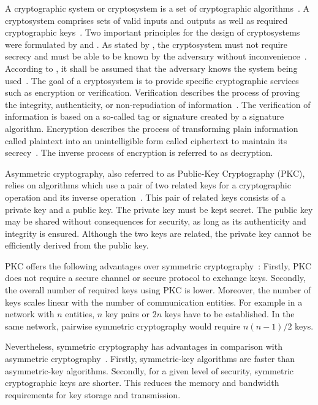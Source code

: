 A cryptographic system or cryptosystem is a set of cryptographic algorithms~\cite{Menezes1996}.
A cryptosystem comprises sets of valid inputs and outputs as well as required cryptographic keys~\cite{Eckert2023}.
Two important principles for the design of cryptosystems were formulated by \citeauthor{Kerckhoffs1883} and \citeauthor{Shannon1949}.
As stated by \citeauthor{Kerckhoffs1883}, the cryptosystem must not require secrecy and must be able to be known by the adversary without inconvenience~\cite{Kerckhoffs1883}.
According to \citeauthor{Shannon1949}, it shall be assumed that the adversary knows the system being used~\cite{Shannon1949}.
The goal of a cryptosystem is to provide specific cryptographic services such as encryption or verification.
Verification describes the process of proving the integrity, authenticity, or non-repudiation of information~\cite{Boneh2023}.
The verification of information is based on a so-called tag or signature created by a signature algorithm.
Encryption describes the process of transforming plain information called plaintext into an unintelligible form called ciphertext to maintain its secrecy~\cite{Barker2016,Boneh2023}.
The inverse process of encryption is referred to as decryption.

Asymmetric cryptography, also referred to as Public-Key Cryptography (PKC), relies on algorithms which use a pair of two related keys for a cryptographic operation and its inverse operation~\cite{Barker2020,CNSS2022,Eckert2023}.
This pair of related keys consists of a private key and a public key.
The private key must be kept secret.
The public key may be shared without consequences for security, as long as its authenticity and integrity is ensured.
Although the two keys are related, the private key cannot be efficiently derived from the public key.

PKC offers the following advantages over symmetric cryptography~\cite{Barker2020,Eckert2023}:
Firstly, PKC does not require a secure channel or secure protocol to exchange keys.
Secondly, the overall number of required keys using PKC is lower.
Moreover, the number of keys scales linear with the number of communication entities.
For example in a network with $n$ entities, $n$ key pairs or $2n$ keys have to be established.
In the same network, pairwise symmetric cryptography would require $n(n-1)/2$ keys.

Nevertheless, symmetric cryptography has advantages in comparison with asymmetric cryptography~\cite{Barker2020}.
Firstly, symmetric-key algorithms are faster than asymmetric-key algorithms.
Secondly, for a given level of security, symmetric cryptographic keys are shorter.
This reduces the memory and bandwidth requirements for key storage and transmission.

